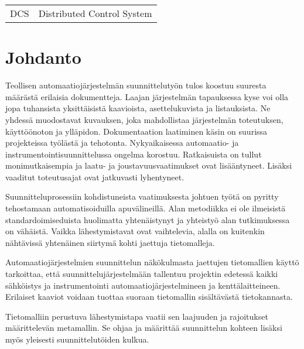 \documentclass[finnish,12pt]{article}
\begin{document}

	\begin{tabular}{ll}
DCS        & Distributed Control System \\

	\end{tabular}

	\cleardoublepage
	\storeinipagenumber
	\setcounter{page}{1}


	\section{Johdanto}
	\thispagestyle{empty}

Teollisen automaatiojärjestelmän suunnittelutyön tulos koostuu suuresta määrästä erilaisia dokumentteja.
Laajan järjestelmän tapauksessa kyse voi olla jopa tuhansista yksittäisistä kaavioista, asettelukuvista ja listauksista.
Ne yhdessä muodostavat kuvauksen, joka mahdollistaa järjestelmän toteutuksen, käyttöönoton ja ylläpidon.
Dokumentaation laatiminen käsin on suurissa projekteissa työlästä ja tehotonta.
Nykyaikaisessa automaatio- ja instrumentointisuunnittelussa ongelma korostuu.
Ratkaisuista on tullut monimutkaisempia ja laatu- ja joustavuusvaatimukset ovat lisääntyneet.
Lisäksi vaaditut toteutusajat ovat jatkuvasti lyhentyneet.
\cite{RefWorks:41}

Suunnitteluprosessiin kohdistuneista vaatimuksesta johtuen työtä on pyritty tehostamaan automatisoiduilla apuvälineillä.
Alan metodiikka ei ole ilmeisistä standardoimiseduista huolimatta yhtenäistynyt ja yhteistyö alan tutkimuksessa on vähäistä.
Vaikka lähestymistavat ovat vaihtelevia, alalla on kuitenkin nähtävissä yhtenäinen siirtymä kohti jaettuja tietomalleja.

Automaatiojärjestelmien suunnittelun näkökulmasta jaettujen tietomallien käyttö tarkoittaa,
että suunnittelujärjestelmään tallentuu projektin edetessä kaikki sähköistys ja instrumentointi automaatiojärjestelmineen ja kenttälaitteineen.
Erilaiset kaaviot voidaan tuottaa suoraan tietomallin sisältävästä tietokannasta.

Tietomalliin perustuva lähestymistapa vaatii sen laajuuden ja rajoitukset määrittelevän metamallin.
Se ohjaa ja määrittää suunnittelun kohteen lisäksi myös yleisesti suunnittelutöiden kulkua.
\end{document}
